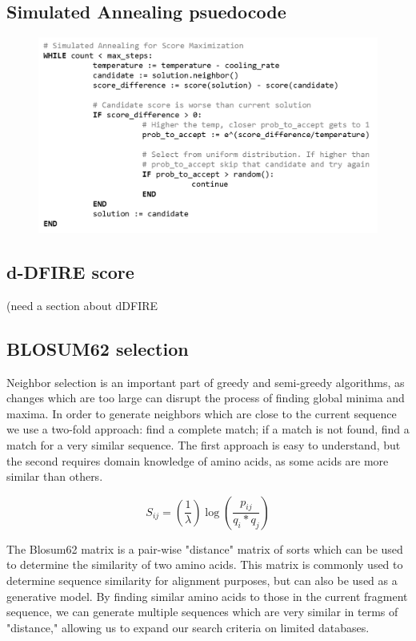 \documentclass{article}
\begin{document}
\begin{enumerate}
\section{Simulated Annealing psuedocode}
\begin{figure}[H]
\begin{center}
\includegraphics[width=\textwidth]{sa}
\label{Fig:blosum}
\end{center}
\end{figure}

\subsection{d-DFIRE score}

(need a section about dDFIRE

\subsection{BLOSUM62 selection}

Neighbor selection is an important part of greedy and semi-greedy algorithms, as changes which are too large can disrupt the process of finding global minima and maxima. In order to generate neighbors which are close to the current sequence we use a two-fold approach: find a complete match; if a match is not found, find a match for a very similar sequence. The first approach is easy to understand, but the second requires domain knowledge of amino acids, as some acids are more similar than others.

\begin{equation*}
S_{ij}= \left( \frac{1}{\lambda} \right)\log{\left( \frac{p_{ij}}{q_i * q_j} \right)}
    \end{equation*}

The Blosum62 matrix is a pair-wise "distance" matrix of sorts which can be used to determine the similarity of two amino acids. This matrix is commonly used to determine sequence similarity for alignment purposes, but can also be used as a generative model. By finding similar amino acids to those in the current fragment sequence, we can generate multiple sequences which are very similar in terms of "distance," allowing us to expand our search criteria on limited databases.


\end{enumerate}
\end{document}
